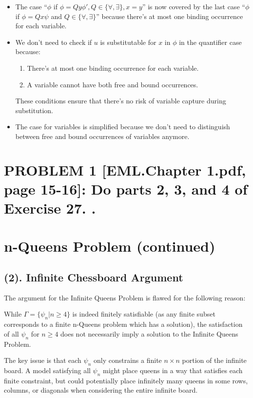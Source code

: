 \documentclass{article}
\begin{document}
\begin{itemize}
    \item The case ``$\phi$ if $\phi = Qy \phi', Q \in \{\forall, \exists\}, x = y$'' is now covered by the last case ``$\phi$ if $\phi = Qx \psi$ and $Q \in \{\forall, \exists\}$'' because there's at most one binding occurrence for each variable.

    \item We don't need to check if $u$ is substitutable for $x$ in $\phi$ in the quantifier case because:
    \begin{enumerate}
        \item There's at most one binding occurrence for each variable.
        \item A variable cannot have both free and bound occurrences.
    \end{enumerate}
    These conditions ensure that there's no risk of variable capture during substitution.

    \item The case for variables is simplified because we don't need to distinguish between free and bound occurrences of variables anymore.
\end{itemize}



\newpage
\section*{PROBLEM 1 [EML.Chapter 1.pdf, page 15-16]: Do parts 2, 3, and 4 of Exercise 27. .}
\section*{n-Queens Problem (continued)}

\subsection*{(2). Infinite Chessboard Argument}

The argument for the Infinite Queens Problem is flawed for the following reason:

While $\Gamma = \{\psi_n | n \geq 4\}$ is indeed finitely satisfiable (as any finite subset corresponds to a finite n-Queens problem which has a solution), the satisfaction of all $\psi_n$ for $n \geq 4$ does not necessarily imply a solution to the Infinite Queens Problem.

The key issue is that each $\psi_n$ only constrains a finite $n \times n$ portion of the infinite board. A model satisfying all $\psi_n$ might place queens in a way that satisfies each finite constraint, but could potentially place infinitely many queens in some rows, columns, or diagonals when considering the entire infinite board.
\end{document}

